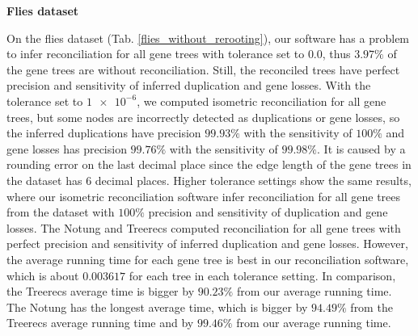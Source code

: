 \noindent\textbf{Flies dataset}

On the flies dataset (Tab. \ref{flies_without_rerooting}), our software has a problem to infer reconciliation for all gene trees with tolerance set to $0.0$, thus $3.97\%$ of the gene trees are without reconciliation. Still, the reconciled trees have perfect precision and sensitivity of inferred duplication and gene losses. With the tolerance set to $\num{1e-6}$, we computed isometric reconciliation for all gene trees, but some nodes are incorrectly detected as duplications or gene losses, so the inferred duplications have precision $99.93\%$ with the sensitivity of $100\%$ and gene losses has precision $99.76\%$ with the sensitivity of $99.98\%$. It is caused by a rounding error on the last decimal place since the edge length of the gene trees in the dataset has 6 decimal places. Higher tolerance settings show the same results, where our isometric reconciliation software infer reconciliation for all gene trees from the dataset with $100\%$ precision and sensitivity of duplication and gene losses. The Notung and Treerecs computed reconciliation for all gene trees with perfect precision and sensitivity of inferred duplication and gene losses. However, the average running time for each gene tree is best in our reconciliation software, which is about $0.003617$ for each tree in each tolerance setting. In comparison, the Treerecs average time is bigger by $90.23\%$ from our average running time. The Notung has the longest average time, which is bigger by $94.49\%$ from the Treerecs average running time and by $99.46\%$ from our average running time.

